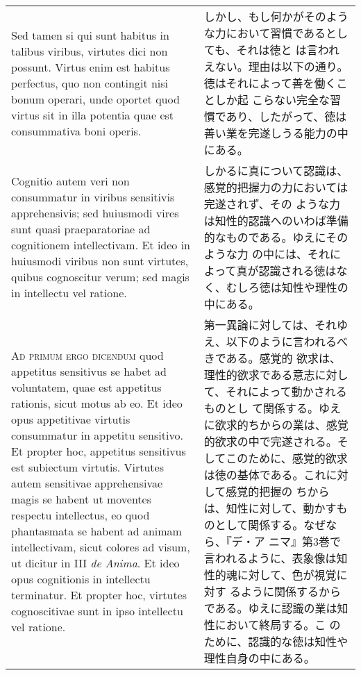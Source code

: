 \documentclass[10pt]{jsarticle}
\begin{document}
\begin{longtable}{p{21em}p{21em}}
 \\

 Sed tamen si qui sunt habitus in talibus viribus, virtutes dici non
 possunt. Virtus enim est habitus perfectus, quo non contingit nisi
 bonum operari, unde oportet quod virtus sit in illa potentia quae est
 consummativa boni operis.

 &

 しかし、もし何かがそのような力において習慣であるとしても、それは徳と
 は言われえない。理由は以下の通り。徳はそれによって善を働くことしか起
 こらない完全な習慣であり、したがって、徳は善い業を完遂しうる能力の中
 にある。

 
 \\

 Cognitio autem veri non consummatur in
 viribus sensitivis apprehensivis; sed huiusmodi vires sunt quasi
 praeparatoriae ad cognitionem intellectivam. Et ideo in huiusmodi
 viribus non sunt virtutes, quibus cognoscitur verum; sed magis in
 intellectu vel ratione.

&

 しかるに真について認識は、感覚的把握力の力においては完遂されず、その
 ような力は知性的認識へのいわば準備的なものである。ゆえにそのような力
 の中には、それによって真が認識される徳はなく、むしろ徳は知性や理性の
 中にある。

 \\



{\scshape Ad primum ergo dicendum} quod appetitus sensitivus se habet
ad voluntatem, quae est appetitus rationis, sicut motus ab eo. Et ideo
opus appetitivae virtutis consummatur in appetitu sensitivo. Et
propter hoc, appetitus sensitivus est subiectum virtutis. Virtutes
autem sensitivae apprehensivae magis se habent ut moventes respectu
intellectus, eo quod phantasmata se habent ad animam intellectivam,
sicut colores ad visum, ut dicitur in III {\itshape de Anima}. Et ideo
opus cognitionis in intellectu terminatur. Et propter hoc, virtutes
cognoscitivae sunt in ipso intellectu vel ratione.

&

 第一異論に対しては、それゆえ、以下のように言われるべきである。感覚的
 欲求は、理性的欲求である意志に対して、それによって動かされるものとし
 て関係する。ゆえに欲求的ちからの業は、感覚的欲求の中で完遂される。そ
 してこのために、感覚的欲求は徳の基体である。これに対して感覚的把握の
 ちからは、知性に対して、動かすものとして関係する。なぜなら、『デ・ア
 ニマ』第3巻で言われるように、表象像は知性的魂に対して、色が視覚に対す
 るように関係するからである。ゆえに認識の業は知性において終局する。こ
 のために、認識的な徳は知性や理性自身の中にある。
 

\end{longtable}
\end{document}
